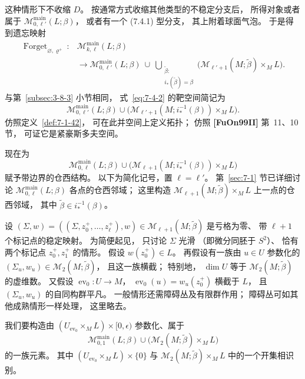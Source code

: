 这种情形下不收缩 $D$。
按通常方式收缩其他类型的不稳定分支后，
所得对象或者属于
$\mathcal M^{\mathrm{main}}_{0,\ell'}(L;\beta)$，
或者有一个 (7.4.1) 型分支，
其上附着球面气泡。
于是得到遗忘映射
\begin{equation}
\begin{aligned}
\operatorname{Forget}_{\varnothing,\varrho^+}\colon&
\mathcal M^{\mathrm{main}}_{k,\ell}(L;\beta)\\
&\longrightarrow
\mathcal M^{\mathrm{main}}_{0,\ell'}(L;\beta)
\ \cup\
\bigcup_{\substack{\widetilde\beta:\\
 i_*(\widetilde\beta)=\beta}}
\bigl(\mathcal M_{\ell'+1}(M;\widetilde\beta)
\times_M L\bigr).
\end{aligned}
\tag{7.4.2}\label{eq:7-4-2}
\end{equation}
与第~\ref{subsec:3-8-3} 小节相同，
式~\eqref{eq:7-4-2} 的靶空间简记为
\[
\mathcal M^{\mathrm{main}}_{0,\ell'}(L;\beta)
\cup
\bigl(\mathcal M_{\ell'+1}
(M;i_*^{-1}(\beta))\times_M L\bigr).
\]
仿照定义~\ref{def:7-1-42}，
可在此并空间上定义拓扑；
仿照 \textbf{[FuOn99II]} 第~11、10 节，
可证它是紧豪斯多夫空间。

现在为
\[
\mathcal M^{\mathrm{main}}_{0,\ell}(L;\beta)
\cup
\bigl(\mathcal M_{\ell+1}
(M;i_*^{-1}(\beta))\times_M L\bigr)
\]
赋予带边界的仓西结构。
以下为简化记号，置 $\ell=\ell'$。
第~\ref{sec:7-1} 节已详细讨论
$\mathcal M^{\mathrm{main}}_{0,\ell}(L;\beta)$
各点的仓西邻域；
这里构造
$\mathcal M_{\ell+1}(M;\widetilde\beta)
\times_M L$ 上一点的仓西邻域，
其中 $\widetilde\beta\in i_*^{-1}(\beta)$。

设
$(\Sigma,w)=((\Sigma,z_0^+,\ldots,z_\ell^+),w)
\in\mathcal M_{\ell+1}(M;\widetilde\beta)$
是亏格为零、
带 $\ell+1$ 个标记点的稳定映射。
为简便起见，
只讨论 $\Sigma$ 光滑
（即微分同胚于 $S^2$）、
恰有两个标记点 $z_0^+,z_1^+$ 的情形。
假设 $w(z_0^+)\in L$。
再假设有一族由 $u\in U$ 参数化的
$(\Sigma_u,w_u)\in\mathcal M_2(M;\widetilde\beta)$，
且这一族横截；
特别地，
$\dim U$ 等于
$\mathcal M_2(M;\widetilde\beta)$ 的虚维数。
又假设
$\operatorname{ev}_0\colon U\to M$，
$\operatorname{ev}_0(u)=w_u(z_0^+)$
横截于 $L$，
且 $(\Sigma_u,w_u)$ 的自同构群平凡。
一般情形还需障碍丛及有限群作用；
障碍丛可如其他成熟情形一样处理，
这里略去。

我们要构造由
$(U_{\operatorname{ev}_0}\times_M L)
\times[0,\epsilon)$
参数化、属于
\[
\mathcal M^{\mathrm{main}}_{0,1}(L;\beta)
\cup
\bigl(\mathcal M_2(M;\widetilde\beta)
\times_M L\bigr)
\]
的一族元素。
其中
$(U_{\operatorname{ev}_0}\times_M L)\times\{0\}$
与
$\mathcal M_2(M;\widetilde\beta)\times_M L$
中的一个开集相识别。

